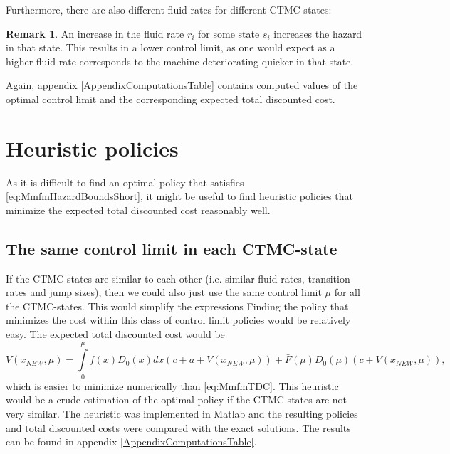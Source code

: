 \documentclass[a4paper]{thesis}
\theoremstyle{definition}
\newtheorem{remark}{Remark}[chapter]
\begin{document}
Furthermore, there are also different fluid rates for different CTMC-states:
\begin{remark}
	An increase in the fluid rate $r_i$ for some state $s_i$ increases the hazard in that state.
	This results in a lower control limit, as one would expect as a higher fluid rate corresponds to the machine deteriorating quicker in that state.
\end{remark}

Again, appendix \ref{AppendixComputationsTable} contains computed values of the optimal control limit and the corresponding expected total discounted cost. \section{Heuristic policies}
As it is difficult to find an optimal policy that satisfies \eqref{eq:MmfmHazardBoundsShort}, it might be useful to find heuristic policies that minimize the expected total discounted cost reasonably well.

\subsection{The same control limit in each CTMC-state}
If the CTMC-states are similar to each other (i.e. similar fluid rates, transition rates and jump sizes), then we could also just use the same control limit $\mu$ for all the CTMC-states.
This would simplify the expressions 
Finding the policy that minimizes the cost within this class of control limit policies would be relatively easy.
The expected total discounted cost would be
\[
V(x_{NEW},\mu)=\int\limits_0^\mu f(x)D_0(x)dx (c+a+V(x_{NEW},\mu))+\bar{F}(\mu)D_0(\mu)(c+V(x_{NEW},\mu)),
\]
which is easier to minimize numerically than \eqref{eq:MmfmTDC}.
This heuristic would be a crude estimation of the optimal policy if the  CTMC-states are not very similar. 
The heuristic was implemented in Matlab and the resulting policies and total discounted costs were compared with the exact solutions.
The results can be found in appendix \ref{AppendixComputationsTable}.
\end{document}
